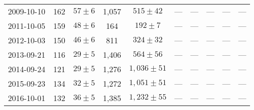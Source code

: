\documentclass[12pt,letterpaper]{article}
\begin{document}
\begin{landscape}
\begin{longtable}{cccccccccc}
	{2009-10-10} & 162 & {$57  \pm  6$} & 1,057 & {$515 \pm 42$} & --- & --- & --- & --- & --- \\
	{2011-10-05} & 159 & {$48  \pm  6$} & 164 & {$192 \pm 7$} & --- & --- & --- & --- & --- \\
	{2012-10-03} & 150 & {$46  \pm  6$} & 811 & {$324 \pm 32$} & --- & --- & --- & --- & --- \\
	{2013-09-21} & 116 & {$29  \pm  5$} & 1,406 & {$564 \pm 56$} & --- & --- & --- & --- & --- \\
	{2014-09-24} & 121 & {$29  \pm  5$} & 1,276 & {$1,036 \pm 51$} & --- & --- & --- & --- & --- \\
	{2015-09-23} & 134 & {$32  \pm  5$} & 1,272 & {$1,051 \pm 51$} & --- & --- & --- & --- & --- \\
	{2016-10-01} & 132 & {$36  \pm  5$} & 1,385 & {$1,232 \pm 55$} & --- & --- & --- & --- & --- \\
\end{longtable}
	\end{landscape}
\end{document}
